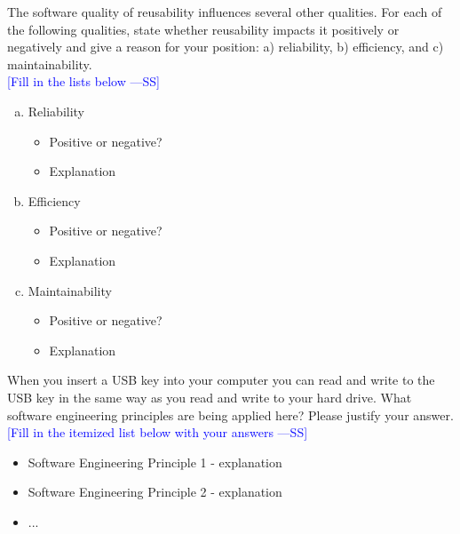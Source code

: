 \documentclass[12pt,fleqn]{examtst}
\newcommand{\authornote}[3]{\textcolor{#1}{[#3 ---#2]}}
\newcommand{\authornote}[3]{}
\newcommand{\wss}[1]{\authornote{blue}{SS}{#1}}
\begin{document}
\newpage


The software quality of reusability influences several other qualities.  For
each of the following qualities, state whether reusability impacts it positively
or negatively and give a reason for your position: a) reliability, b)
efficiency, and c) maintainability.\\

\noindent \wss{Fill in the lists below}

\begin{enumerate}[a)]
\item Reliability
\begin{itemize}
\item Positive or negative?
\item Explanation
\end{itemize}
\item Efficiency
\begin{itemize}
\item Positive or negative?
\item Explanation
\end{itemize}
\item Maintainability
\begin{itemize}
\item Positive or negative?
\item Explanation
\end{itemize}
\end{enumerate}


\newpage

 When you insert a USB key into your computer you can read and
write to the USB key in the same way as you read and write to your hard drive.  What
software engineering principles are being applied here?  Please justify your
answer.\\

\noindent \wss{Fill in the itemized list below with your answers}

\begin{itemize}
\item Software Engineering Principle 1 - explanation
\item Software Engineering Principle 2 - explanation
\item ...
\end{itemize}
\end{document}
